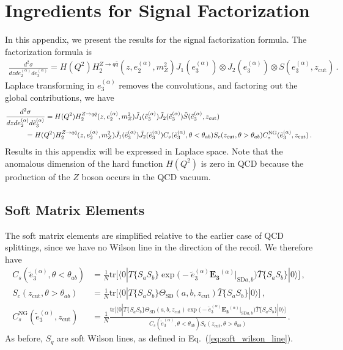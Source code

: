 \documentclass[a4paper,11pt]{article}
\newcommand{\ecf}[2]{e_{#1}^{(#2)}}
\newcommand{\ecflp}[2]{\tilde e_{#1}^{(#2)}}
\newcommand{\ecfop}[2]{\mathbf{E_{#1}}^{(#2)}}
\newcommand{\nn}{\nonumber}
\def\zcut{z_{\text{cut}}}
\DeclareRobustCommand{\Eq}[1]{Eq.~(\ref{#1})}
\begin{document}
\section{Ingredients for Signal Factorization}\label{app:signal}



In this appendix, we present the results for the signal factorization formula. The factorization formula is
\begin{align}
\frac{d^2\sigma}{dz d\ecf{2}{\alpha}d\ecf{3}{\alpha}}=H(Q^2)H_2^{Z\rightarrow q \bar q}(z,\ecf{2}{\alpha},m_Z^2) J_1(\ecf{3}{\alpha})\otimes J_2(\ecf{3}{\alpha})\otimes S(\ecf{3}{\alpha},\zcut) \,. 
\end{align}
Laplace transforming in $\ecf{3}{\alpha}$ removes the convolutions, and factoring out the global contributions, we have
{\small\begin{align}
\frac{d^2\sigma}{dz d\ecf{2}{\alpha}d\ecflp{3}{\alpha}}&=H(Q^2)H_2^{Z\rightarrow q \bar q}(z,\ecf{2}{\alpha},m_Z^2) \tilde J_1(\ecflp{3}{\alpha}) \tilde J_2(\ecflp{3}{\alpha}) \tilde S(\ecflp{3}{\alpha},\zcut)\,\\
&\hspace{-1cm}= H(Q^2)H_2^{Z\rightarrow q \bar q}(z,\ecf{2}{\alpha},m_Z^2) \tilde J_1(\ecflp{3}{\alpha}) \tilde J_2(\ecflp{3}{\alpha})C_s(\ecflp{3}{\alpha},\theta<\theta_{ab})S_c(\zcut,\theta>\theta_{ab})C^{\text{NG}}_s(\ecflp{3}{\alpha},\zcut)\,. \nn
\end{align}}
Results in this appendix will be expressed in Laplace space.  Note that the anomalous dimension of the hard function $H(Q^2)$ is zero in QCD because the production of the $Z$ boson occurs in the QCD vacuum.

\subsection{Soft Matrix Elements}
The soft matrix elements are simplified relative to the earlier case of QCD splittings, since we have no Wilson line in the direction of the recoil. We therefore have
\begin{align}
C_s(\ecflp{3}{\alpha},\theta<\theta_{ab})&=\frac{1}{N}\text{tr}\Big[\langle 0|T\{S_{a}S_{b}\}\exp\Big(-\ecflp{3}{\alpha}\ecfop{3}{\alpha}\big|_{\text{SD} a,b}\Big)\bar T\{S_{a}S_{b}\}|0\rangle\Big]\,, \\
S_c(\zcut,\theta>\theta_{ab})&=\frac{1}{N}\text{tr}\Big[\langle 0|T\{S_{a}S_{b}\}\Theta_{\text{SD}}(a,b,\zcut)\bar T\{S_{a}S_{b}\}|0\rangle\Big]\,,\\
C^{\text{NG}}_s(\ecflp{3}{\alpha},\zcut)&=\frac{1}{N}\frac{\text{tr}\Big[\langle 0|T\{S_{a}S_{b}\}\Theta_{\text{SD}}(a,b,\zcut)\exp\Big(-\ecflp{3}{\alpha}\ecfop{3}{\alpha}\big|_{\text{SD} a,b}\Big)\bar T\{S_{a}S_{b}\}|0\rangle\Big]}{C_s(\ecflp{3}{\alpha},\theta<\theta_{ab})S_c(\zcut,\theta>\theta_{ab})}\,.
\end{align}
As before, $S_q$ are soft Wilson lines, as defined in \Eq{eq:soft_wilson_line}.
\end{document}
